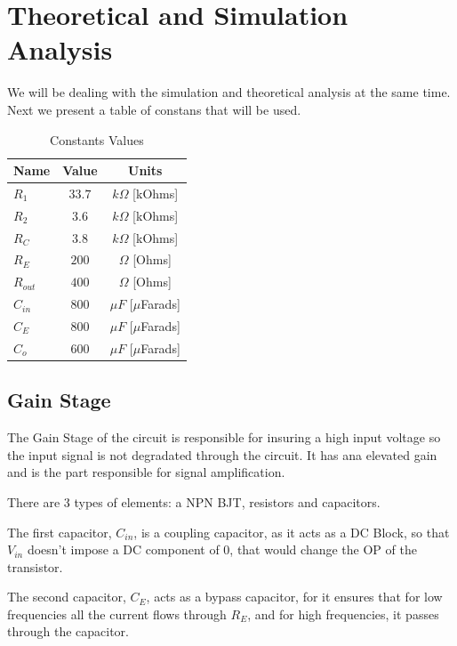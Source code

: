 \section{Theoretical and Simulation Analysis}
\label{sec:analysis}

We will be dealing with the simulation and theoretical analysis at the same time. Next we present a table of constans that will be used.

\begin{table}[h]
    \centering
    \begin{tabular}{|l|c|c|}
    \hline
    {\bf Name} & {\bf Value} & {\bf Units} \\ \hline
    $R_1$ & $33.7$ & $k\Omega$ [kOhms] \\ \hline
    $R_2$ & $3.6$ & $k\Omega$ [kOhms] \\ \hline
    $R_C$ & $3.8$ & $k\Omega$ [kOhms] \\ \hline
    $R_E$ & $200$ & $\Omega$ [Ohms] \\ \hline
    $R_{out}$ & $400$ & $\Omega$ [Ohms] \\ \hline
    $C_{in}$ & $800$ & $\mu F$ [$\mu$Farads]\\ \hline
    $C_E$ & $800$ & $\mu F$ [$\mu$Farads] \\ \hline
    $C_o$ & $600$ & $\mu F$ [$\mu$Farads] \\ \hline
    \end{tabular}
    \caption{Constants Values}
    \label{tab:constants}
\end{table}

\subsection{Gain Stage}
\label{subsec:stat}

The Gain Stage of the circuit is responsible for insuring a high input voltage so the input signal is not degradated through the circuit. It has ana elevated gain and is the part responsible for signal amplification.

There are 3 types of elements: a NPN BJT, resistors and capacitors.

The first capacitor, $C_{in}$, is a coupling capacitor, as it acts as a DC Block, so that $V_{in}$ doesn't impose a DC component of 0, that would change the OP of the transistor.

The second capacitor, $C_E$, acts as a bypass capacitor, for it ensures that for low frequencies all the current flows through $R_E$, and for high frequencies, it passes through the capacitor.

